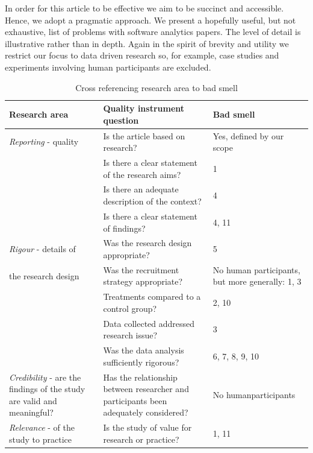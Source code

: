 \documentclass[preprint,10pt]{elsarticle}
\begin{document}
In order for this article to be effective we aim to be succinct and accessible. Hence, we adopt a  pragmatic approach.  We present a hopefully useful, but not exhaustive, list of problems with software analytics papers. The level of detail is illustrative rather than in depth.  Again in the spirit of brevity and utility we restrict our focus to data driven research so, for example, case studies and experiments involving human participants are excluded.


\begin{table}[!t]
\caption{Cross referencing research area to bad smell }
\small
\begin{center}
\begin{tabular}{|p{3cm}|p{6cm}|p{2cm}|}
\hline
\textbf{Research area} \cite{Kitc15} & \textbf{Quality instrument question} \cite[Table 3]{Dyba08} & \textbf{Bad smel}l\\
\hline
\textit{Reporting} - quality  & Is the article based on research? & Yes, defined by our scope \\
& Is there a clear statement of the research aims? & 1 \\
& Is there an adequate description of the context? & 4 \\
& Is there a clear statement of findings? & 4, 11 \\
\hline
\textit{Rigour} -  details of  & Was the research design appropriate? & 5 \\
the research design & Was the recruitment strategy appropriate? & No human participants, but more generally: 1, 3 \\
& Treatments compared to a  control group? & 2, 10 \\
& Data collected   addressed   research issue? & 3 \\
& Was the data analysis sufficiently rigorous? & 6, 7, 8, 9, 10 \\ 
\hline
\textit{Credibility} - are the findings of the study are valid and meaningful? & Has the relationship between researcher and participants been adequately considered?& No human\newline participants \\
\hline
\textit{Relevance} -  of the study to practice & Is the study of value for research or practice? & 1, 11\\
\hline
\end{tabular}
\end{center}
\label{Tab:Xref}
\end{table}%
\end{document}
